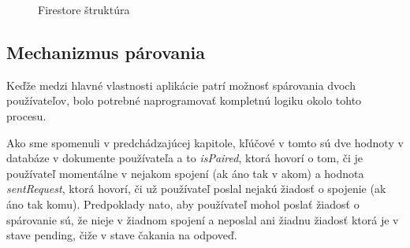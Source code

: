 \begin{figure}[hbt!]
  \centering   
  \def\stackalignment{c}
           \scriptsize
	\caption{Firestore štruktúra}  
  \label{dbstructure}
\end{figure}

\subsection{Mechanizmus párovania}
Keďže medzi hlavné vlastnosti aplikácie patrí možnosť spárovania dvoch používateľov, bolo potrebné naprogramovať kompletnú logiku okolo tohto procesu. 

Ako sme spomenuli v predchádzajúcej kapitole, kľúčové v tomto sú dve hodnoty v databáze v dokumente používateľa a to \textit{isPaired}, ktorá hovorí o tom, či je používateľ momentálne v nejakom spojení (ak áno tak v akom) a hodnota \textit{sentRequest}, ktorá hovorí, či už používateľ poslal nejakú žiadosť o spojenie (ak áno tak komu). Predpoklady nato, aby používateľ mohol poslať žiadosť o spárovanie sú, že nieje v žiadnom spojení a neposlal ani žiadnu žiadosť ktorá je v stave pending, čiže v stave čakania na odpoveď. 

